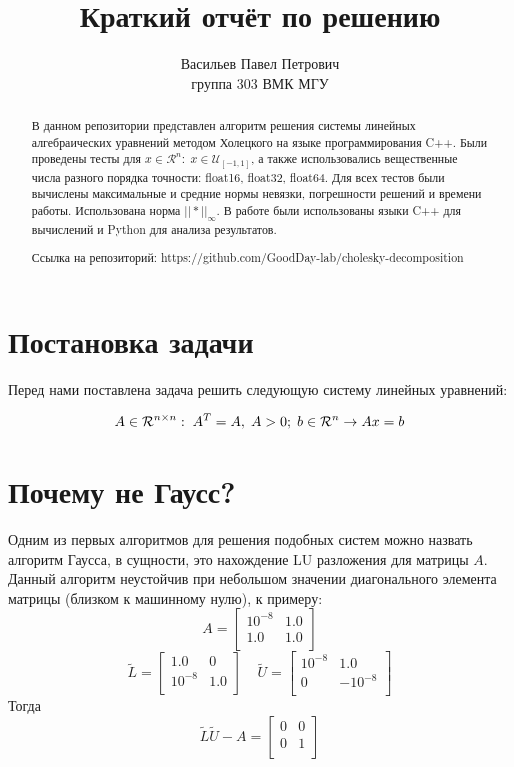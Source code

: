 \documentclass[12pt]{article}
\title{Краткий отчёт по решению}
\author{Васильев Павел Петрович \\ группа 303 ВМК МГУ}
\begin{document}
	
	\maketitle
	
	\begin{abstract}
	В данном репозитории представлен алгоритм решения системы линейных алгебраических уравнений методом Холецкого на языке программирования C++. Были проведены тесты для $x \in \mathcal{R}^n: \; x \in \mathcal{U}_{[-1, 1]}$, а также использовались вещественные числа разного порядка точности: float16, float32, float64. Для всех тестов были вычислены максимальные и средние нормы невязки, погрешности решений и времени работы. Использована норма $||*||_{\infty}$. В работе были использованы языки C++ для вычислений и Python для анализа результатов.
	
	Ссылка на репозиторий:  https://github.com/GoodDay-lab/cholesky-decomposition
	\end{abstract}
	
	\section{Постановка задачи}
	Перед нами поставлена задача решить следующую систему линейных уравнений:
	
	\begin{align}
	\mathnormal{A} \in \mathcal{R}^{n \times n}: \; A^T = A, \; A > 0; \; b \in \mathcal{R}^n \rightarrow
	Ax = b
	\end{align}
		
	\section{Почему не Гаусс?}
		Одним из первых алгоритмов для решения подобных систем можно назвать алгоритм Гаусса, в сущности, это нахождение LU разложения для матрицы $A$. Данный алгоритм неустойчив при небольшом значении диагонального элемента матрицы (близком к машинному нулю), к примеру:
	\[
	A = 
	\begin{bmatrix}
		10^{-8} & 1 .0 \\
		1.0 & 1.0 \\
	\end{bmatrix}
	\] 
	\[
	\tilde{L} =
	\begin{bmatrix}
		1.0 & 0 \\
		10^{-8} & 1.0 \\
	\end{bmatrix}
	\;\;\;\;
	\tilde{U} =
	\begin{bmatrix}
		10^{-8} & 1.0 \\
		0 & -10^{-8} \\
	\end{bmatrix}
	\]
	Тогда 
	\[
	\tilde{L} \tilde{U} - A =
	\begin{bmatrix}
		0 & 0 \\
		0 & 1 \\
	\end{bmatrix}
	\]
	
\end{document}
